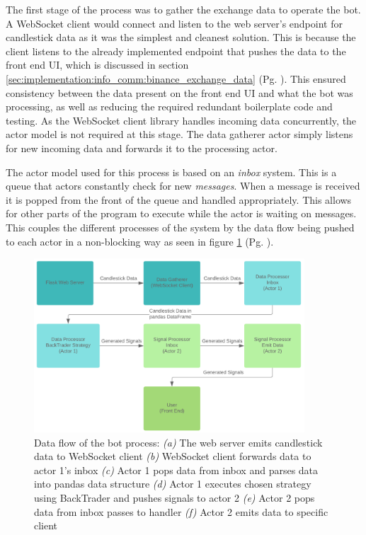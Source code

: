The first stage of the process was to gather the exchange data to operate the bot. A WebSocket client would connect and listen to the web server's endpoint for candlestick data as it was the simplest and cleanest solution. This is because the client listens to the already implemented endpoint that pushes the data to the front end UI, which is discussed in section \ref{sec:implementation:info_comm:binance_exchange_data} (Pg. \pageref{sec:implementation:info_comm:binance_exchange_data}). This ensured consistency between the data present on the front end UI and what the bot was processing, as well as reducing the required redundant boilerplate code and testing. As the WebSocket client library \cite{MISC:socketio_client} handles incoming data concurrently, the actor model is not required at this stage. The data gatherer actor simply listens for new incoming data and forwards it to the processing actor.

The actor model used for this process is based on an \textit{inbox} system. This is a queue that actors constantly check for new \textit{messages}. When a message is received it is popped from the front of the queue and handled appropriately. This allows for other parts of the program to execute while the actor is waiting on messages. This couples the different processes of the system by the data flow being pushed to each actor in a non-blocking way as seen in figure \ref{fig:implementation:actor_dataflow} (Pg. \pageref{fig:implementation:actor_dataflow}). 

\begin{figure}[htb]
    \centering
	\includegraphics[width=0.9\textwidth]{content/graphics/diagrams/actor_dataflow.png}
	\caption{Data flow of the bot process: 
	\textit{(a)} The web server emits candlestick data to WebSocket client
	\textit{(b)} WebSocket client forwards data to actor 1's inbox
    \textit{(c)} Actor 1 pops data from inbox and parses data into pandas data structure
    \textit{(d)} Actor 1 executes chosen strategy using BackTrader and pushes signals to actor 2
    \textit{(e)} Actor 2 pops data from inbox passes to handler
    \textit{(f)} Actor 2 emits data to specific client}
    
	\label{fig:implementation:actor_dataflow}
\end{figure}

